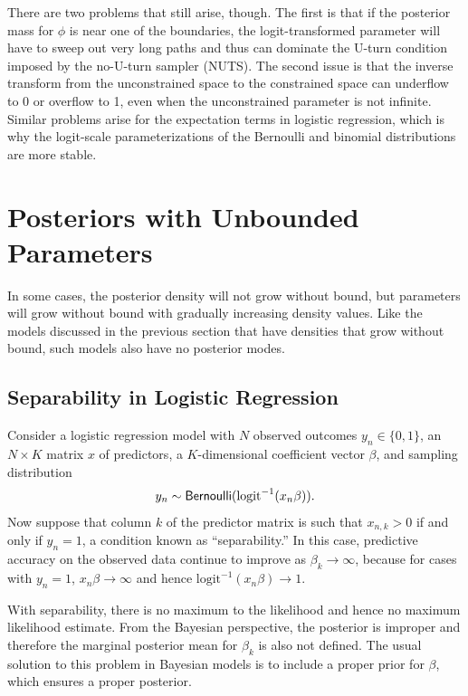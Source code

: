 There are two problems that still arise, though.  The first is that if
the posterior mass for $\phi$ is near one of the boundaries, the
logit-transformed parameter will have to sweep out very long paths and
thus can dominate the U-turn condition imposed by the no-U-turn
sampler (NUTS).  The second issue is that the inverse transform from
the unconstrained space to the constrained space can underflow to 0 or
overflow to 1, even when the unconstrained parameter is not infinite.
Similar problems arise for the expectation terms in logistic
regression, which is why the logit-scale parameterizations of the
Bernoulli and binomial distributions are more stable.



\section{Posteriors with Unbounded Parameters}

In some cases, the posterior density will not grow without bound, but
parameters will grow without bound with gradually increasing density
values.  Like the models discussed in the previous section that have
densities that grow without bound, such models also have no posterior
modes.


\subsection{Separability in Logistic Regression}

Consider a logistic regression model with $N$ observed outcomes $y_n
\in \{ 0, 1 \}$, an $N \times K$ matrix $x$ of predictors, a
$K$-dimensional coefficient vector $\beta$, and sampling distribution
\[
y_n \sim \mbox{\sf Bernoulli}(\mbox{logit}^{-1}(x_n \beta)).
\]
Now suppose that column $k$ of the predictor matrix is such that
$x_{n,k} > 0$ if and only if $y_n = 1$, a condition known as
``separability.''  In this case, predictive accuracy on the observed data
continue to improve as $\beta_k \rightarrow \infty$, because for cases
with $y_n = 1$, $x_n \beta \rightarrow \infty$ and hence
$\mbox{logit}^{-1}(x_n \beta) \rightarrow 1$.

With separability, there is no maximum to the likelihood and hence no
maximum likelihood estimate.  From the Bayesian perspective, the
posterior is improper and therefore the marginal posterior mean for
$\beta_k$ is also not defined.  The usual solution to this problem in
Bayesian models is to include a proper prior for $\beta$, which
ensures a proper posterior.


